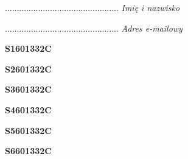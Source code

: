 \begin{turn}{90}\begin{minipage}{\linewidth} \vspace{20mm} ................................................  \textit{Imię i nazwisko}\end{minipage}\end{turn}

\begin{turn}{90}\begin{minipage}{\linewidth} \vspace{20mm} ................................................  \textit{Adres e-mailowy}\end{minipage}\end{turn}

\begin{turn}{90}\huge \begin{minipage}{\linewidth} \vspace{10mm}\textbf{S1601332C}\end{minipage}\end{turn}

\begin{turn}{90}\huge \begin{minipage}{\linewidth} \vspace{10mm}\textbf{S2601332C}\end{minipage}\end{turn}

\begin{turn}{90}\huge \begin{minipage}{\linewidth} \vspace{10mm}\textbf{S3601332C}\end{minipage}\end{turn}

\begin{turn}{90}\huge \begin{minipage}{\linewidth} \vspace{10mm}\textbf{S4601332C}\end{minipage}\end{turn}

\begin{turn}{90}\huge \begin{minipage}{\linewidth} \vspace{10mm}\textbf{S5601332C}\end{minipage}\end{turn}

\begin{turn}{90}\huge \begin{minipage}{\linewidth} \vspace{10mm}\textbf{S6601332C}\end{minipage}\end{turn}

